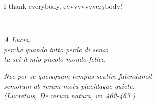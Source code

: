 I thank everybody, evvvvvvvverybody!

\cleardoublepage
~

\begin{flushright}
  \emph{A Lucia, \\
  perch\'{e} quando tutto perde di senso \\
  tu sei il mio piccolo mondo felice.}
  
  \vspace{10cm}
  
   \emph{
   Nec per se quemquam tempus sentire fatendumst \\
   semotum ab rerum motu placidaque quiete. \\
   (Lucretius, De rerum natura, vv. 462-463 )
   } 
\end{flushright}

\cleardoublepage
